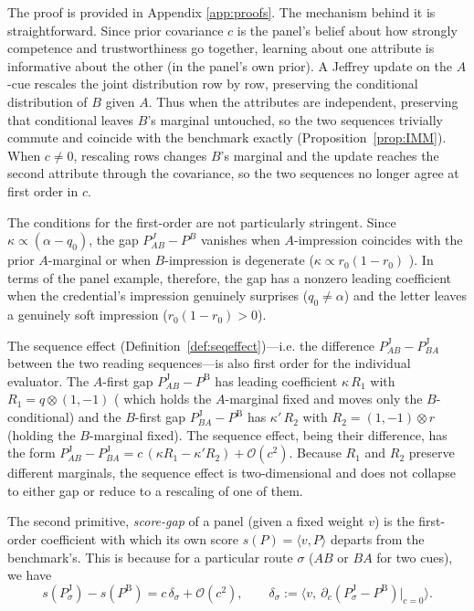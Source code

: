 \documentclass[a4paper,fleqn]{cas-sc}
\theoremstyle{remark}
\theoremstyle{definition}
\newcommand{\PB}{P^{\mathrm{B}}}
\newcommand{\PJ}{P^{\mathrm{J}}}
\newcommand{\bigO}{\mathcal{O}}
\newcommand{\vv}{v}
\begin{document}
The proof is provided in Appendix \ref{app:proofs}. The mechanism behind it is straightforward. Since prior covariance $c$ is the panel's belief about how strongly competence and trustworthiness go together, learning about one attribute is informative about the other (in the panel's own prior). A Jeffrey update on the $A$-cue rescales the joint distribution row by row, preserving the conditional distribution of $B$ given $A$. Thus when the attributes are independent, preserving that conditional leaves $B$'s marginal untouched, so the two sequences trivially commute and coincide with the benchmark exactly (Proposition~\ref{prop:IMM}). When $c\neq0$, rescaling rows changes $B$'s marginal and the update reaches the second attribute through the covariance, so the two sequences no longer agree at first order in $c$.  

The conditions for the first-order are not particularly stringent. Since $\kappa\propto(\alpha-q_0)$, the gap $P^J_{AB}-P^B$ vanishes when $A$-impression coincides with the prior $A$-marginal or when $B$-impression is degenerate ($\kappa\propto r_0(1-r_0)$ ). In terms of the panel example, therefore, the gap has a nonzero leading coefficient when the credential's impression genuinely surprises ($q_{0}\neq\alpha$) and the letter leaves a genuinely soft impression ($r_{0}(1-r_{0})>0$).

The sequence effect (Definition~\ref{def:seqeffect})---i.e. the difference $\PJ_{AB}-\PJ_{BA}$ between the two reading sequences---is also first order for the individual evaluator. The $A$-first gap $\PJ_{AB}-\PB$ has leading coefficient $\kappa\,R_1$ with $R_1=q\otimes(1,-1)$ (
which holds the $A$-marginal fixed and moves only the $B$-conditional) and the $B$-first gap $\PJ_{BA}-\PB$ has $\kappa'\,R_2$ with $R_2=(1,-1)\otimes r$ (holding the $B$-marginal fixed). The sequence effect, being their difference, has the form $\PJ_{AB}-\PJ_{BA}=c\,(\kappa R_1-\kappa' R_2)+\bigO(c^2)$. Because $R_1$ and $R_2$ preserve different marginals, the sequence effect is two-dimensional and does not collapse to either gap or reduce to a rescaling of one of them.

The second primitive, \emph{score-gap} of a panel (given a fixed weight $\vv$) is the first-order coefficient with which its own score $s(P)=\langle\vv,P\rangle$ departs from the benchmark's. This is because for a particular route $\sigma$ ($AB$ or $BA$ for two cues), we have
\[
  s(\PJ_\sigma)-s(\PB)=c\,\delta_\sigma+\bigO(c^{2}), \qquad \delta_\sigma:=\big\langle\vv,\ \partial_c(\PJ_\sigma-\PB)|_{c=0}\big\rangle.
\]
\end{document}
